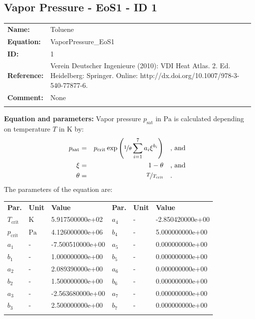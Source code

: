 \FloatBarrier
\newpage
\subsection{Vapor Pressure - EoS1 - ID 1}
%
\begin{tabular}[l]{|lp{11.5cm}|}
\hline
\addlinespace

\textbf{Name:} & Toluene \\
\textbf{Equation:} & VaporPressure\_EoS1 \\
\textbf{ID:} & 1 \\
\textbf{Reference:} & Verein Deutscher Ingenieure (2010): VDI Heat Atlas. 2. Ed. Heidelberg: Springer. Online: http://dx.doi.org/10.1007/978-3-540-77877-6. \\
\textbf{Comment:} & None \\

\addlinespace
\hline
\end{tabular}
\newline

\textbf{Equation and parameters:}
\newline
%
Vapor pressure $p_\mathrm{sat}$ in $\si{\pascal}$ is calculated depending on temperature $T$ in $\si{\kelvin}$ by:
%
\begin{equation*}
\begin{split}
p_\mathrm{sat} &=& p_\mathrm{crit} \exp \left( \nicefrac{1}{\theta} \sum_{i=1}^{7} a_i \xi^{b_i} \right) & \quad\text{, and} \\
\xi &=& 1 - \theta & \quad\text{, and} \\
\theta &=& \nicefrac{T}{T_\mathrm{crit}} & \quad\text{.}
\end{split}
\end{equation*}
%
The parameters of the equation are:
%
\begin{longtable}[l]{lll|lll}
\toprule
\addlinespace
\textbf{Par.} & \textbf{Unit} & \textbf{Value} &	\textbf{Par.} & \textbf{Unit} & \textbf{Value} \\
\addlinespace
\midrule
\endhead

\bottomrule
\endfoot
\bottomrule
\endlastfoot
\addlinespace

$T_\mathrm{crit}$ & $\si{\kelvin}$ & 5.917500000e+02 & $a_4$ & - & -2.850420000e+00 \\
$p_\mathrm{crit}$ & $\si{\pascal}$ & 4.126000000e+06 & $b_4$ & - & 5.000000000e+00 \\
$a_1$ & - & -7.500510000e+00 & $a_5$ & - & 0.000000000e+00 \\
$b_1$ & - & 1.000000000e+00 & $b_5$ & - & 0.000000000e+00 \\
$a_2$ & - & 2.089390000e+00 & $a_6$ & - & 0.000000000e+00 \\
$b_2$ & - & 1.500000000e+00 & $b_6$ & - & 0.000000000e+00 \\
$a_3$ & - & -2.563680000e+00 & $a_7$ & - & 0.000000000e+00 \\
$b_3$ & - & 2.500000000e+00 & $b_7$ & - & 0.000000000e+00 \\

\addlinespace\end{longtable}

